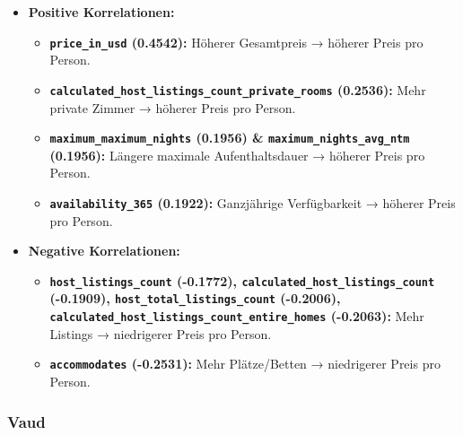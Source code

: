 \documentclass[
  journal,
]{IEEEtran}%
\providecommand{\tightlist}{%
  \setlength{\itemsep}{0pt}\setlength{\parskip}{0pt}}\usepackage{longtable,booktabs,array}
\begin{document}
\begin{itemize}
\item
  \textbf{Positive Korrelationen:}

  \begin{itemize}
  \tightlist
  \item
    \textbf{\texttt{price\_in\_usd} (0.4542):} Höherer Gesamtpreis →
    höherer Preis pro Person.
  \item
    \textbf{\texttt{calculated\_host\_listings\_count\_private\_rooms}
    (0.2536):} Mehr private Zimmer → höherer Preis pro Person.
  \item
    \textbf{\texttt{maximum\_maximum\_nights} (0.1956) \&
    \texttt{maximum\_nights\_avg\_ntm} (0.1956):} Längere maximale
    Aufenthaltsdauer → höherer Preis pro Person.
  \item
    \textbf{\texttt{availability\_365} (0.1922):} Ganzjährige
    Verfügbarkeit → höherer Preis pro Person.
  \end{itemize}
\item
  \textbf{Negative Korrelationen:}

  \begin{itemize}
  \tightlist
  \item
    \textbf{\texttt{host\_listings\_count} (-0.1772),
    \texttt{calculated\_host\_listings\_count} (-0.1909),
    \texttt{host\_total\_listings\_count} (-0.2006),
    \texttt{calculated\_host\_listings\_count\_entire\_homes}
    (-0.2063):} Mehr Listings → niedrigerer Preis pro Person.
  \item
    \textbf{\texttt{accommodates} (-0.2531):} Mehr Plätze/Betten →
    niedrigerer Preis pro Person.
  \end{itemize}
\end{itemize}

\subsubsection{Vaud}\label{vaud}
\end{document}
